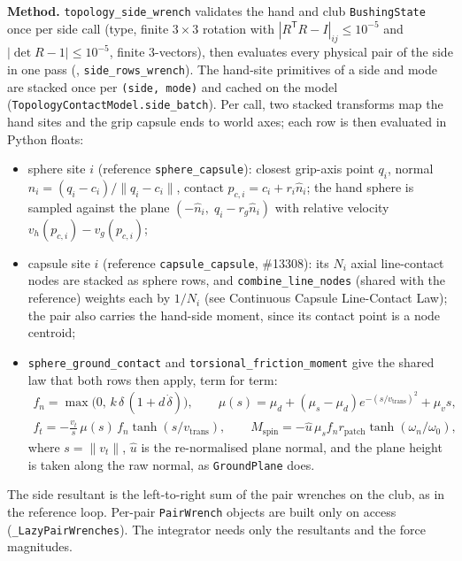 \documentclass[11pt,a4paper]{article}
\begin{document}
\textbf{Method.} \texttt{topology\_side\_wrench} validates the hand and club \texttt{BushingState} once per side call
(type, finite $3\times3$ rotation with $|R^{\mathsf T}R - I|_{ij} \le 10^{-5}$ and $|\det R - 1| \le 10^{-5}$, finite
$3$-vectors), then evaluates every physical pair of the side in one pass
(, \texttt{side\_rows\_wrench}). The hand-site primitives of a
side and mode are stacked once per \texttt{(side, mode)} and cached on the model (\texttt{TopologyContactModel.side\_batch}).
Per call, two stacked transforms map the hand sites and the grip capsule ends to world axes; each row is then evaluated in
Python floats:
\begin{itemize}[leftmargin=*,noitemsep]
\item sphere site $i$ (reference \texttt{sphere\_capsule}): closest grip-axis point $q_i$, normal
  $\hat n_i = (q_i - c_i)/\|q_i - c_i\|$, contact $p_{c,i} = c_i + r_i \hat n_i$; the hand sphere is sampled against the
  plane $(-\hat n_i,\; q_i - r_g \hat n_i)$ with relative velocity $v_h(p_{c,i}) - v_g(p_{c,i})$;
\item capsule site $i$ (reference \texttt{capsule\_capsule}, \#13308): its $N_i$ axial line-contact nodes are stacked as
  sphere rows, and \texttt{combine\_line\_nodes} (shared with the reference) weights each by $1/N_i$ (see Continuous
  Capsule Line-Contact Law); the pair also carries the hand-side moment, since its contact point is a node centroid;
\item \texttt{sphere\_ground\_contact} and \texttt{torsional\_friction\_moment} give the shared law that both rows
  then apply, term for term:
  \begin{gather*}
  f_n = \max\!\big(0,\, k\,\delta\,(1 + d\,\dot\delta)\big), \qquad
  \mu(s) = \mu_d + (\mu_s - \mu_d)e^{-(s/v_{\mathrm{trans}})^2} + \mu_v s, \\
  f_t = -\tfrac{v_t}{s}\,\mu(s)\,f_n \tanh(s/v_{\mathrm{trans}}), \qquad
  M_{\mathrm{spin}} = -\hat u\,\mu_s f_n r_{\mathrm{patch}} \tanh(\omega_n/\omega_0),
  \end{gather*}
  where $s = \|v_t\|$, $\hat u$ is the re-normalised plane normal, and the plane height is taken along the raw normal, as
  \texttt{GroundPlane} does.
\end{itemize}
The side resultant is the left-to-right sum of the pair wrenches on the club, as in the reference loop. Per-pair
\texttt{PairWrench} objects are built only on access (\texttt{\_LazyPairWrenches}). The integrator needs only the resultants
and the force magnitudes.
\end{document}
